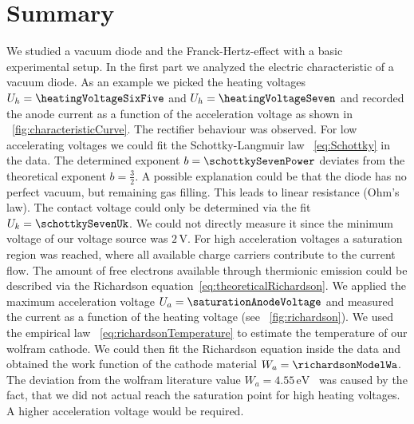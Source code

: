 \documentclass[a4paper,10pt,twocolumn]{article}
\newcommand{\wolframWa}{4.55\, \mathrm{eV}}
\newcommand{\volt}{\, \mathrm{V}}
\newcommand{\minvoltage}{2 \volt}
\begin{document}
    \section{Summary}
    
    We studied a vacuum diode and the Franck-Hertz-effect with a basic experimental setup.
    In the first part we analyzed the electric characteristic of a vacuum diode.
    As an example we picked the heating voltages $U_h = \heatingVoltageSixFive$ and $U_h = \heatingVoltageSeven$
    and recorded the anode current as a function of the acceleration voltage as shown in ~\autoref{fig:characteristicCurve}.
    The rectifier behaviour was observed.
    For low accelerating voltages we could fit the Schottky-Langmuir law ~\eqref{eq:Schottky} in the data.
    The determined exponent $b = \schottkySevenPower$ deviates from the theoretical exponent $b = \frac{3}{2}$.
    A possible explanation could be that the diode has no perfect vacuum, but remaining gas filling.
    This leads to linear resistance (Ohm's law).
    The contact voltage could only be determined via the fit $U_k = \schottkySevenUk$.
    We could not directly measure it since the minimum voltage of our voltage source was $\minvoltage$.
    For high acceleration voltages a saturation region was reached, where all available charge carriers 
    contribute to the current flow.
    The amount of free electrons available through thermionic emission could be described
    via the Richardson equation~\eqref{eq:theoreticalRichardson}.
    We applied the maximum acceleration voltage $U_a = \saturationAnodeVoltage$ and measured the current
    as a function of the heating voltage (see ~\autoref{fig:richardson}).
    We used the empirical law ~\eqref{eq:richardsonTemperature} to estimate the temperature of our wolfram cathode.
    We could then fit the Richardson equation inside the data and obtained the work function of the cathode material
    $W_a = \richardsonModelWa$.
    The deviation from the wolfram literature value $W_a = \wolframWa$~\cite{wolfram} was caused by the fact, that
    we did not actual reach the saturation point for high heating voltages.
    A higher acceleration voltage would be required.
    
\end{document}

